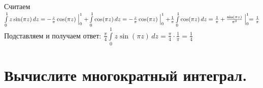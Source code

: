 \documentclass[a4paper, fleqn]{article}
\begin{document}
    Считаем $ \int\limits_{0}^{1} z \sin (\pi z) \,  dz = -\frac{z}{\pi} \cos (\pi z) \Bigm|_{0}^{1} + \int\limits_{0}^{1} \cos (\pi z) \, dz = -\frac{z}{\pi} \cos (\pi z) \Bigm|_{0}^{1} + \frac1{\pi} \int\limits_{0}^{1} \cos (\pi z) \, dz = \frac{1}{\pi} + \frac{\sin (\pi z)}{\pi^2} \Bigm|_{0}^{1} = \frac1{\pi}$\\
    
    Подставляем и получаем ответ: $\frac{\pi}{4}  \int\limits_{0}^{1} z \sin (\pi z) \,  dz = \frac{\pi}4 \cdot \frac1{\pi} = \frac14$
    
    
    
    
    
    \section*{Вычислите многократный интеграл.}
    
    
    
    
    
    
\end{document}
